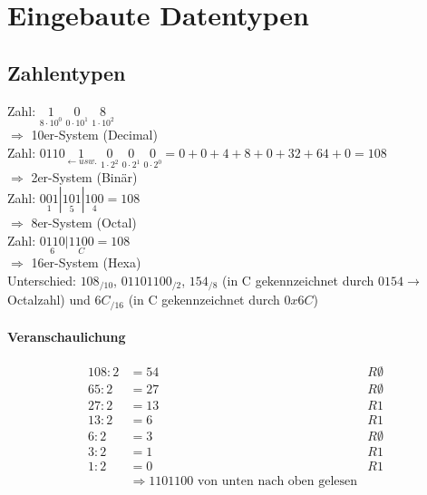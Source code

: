 







\maketitle
\newpage
\tableofcontents
\newpage


\section{Eingebaute Datentypen}

\subsection{Zahlentypen}
Zahl: $\underset{8\cdot 10^0}{1} \; \underset{0 \cdot 10^1}{0} \;\underset{1\cdot 10^2}{8}$\\
$\Rightarrow$ 10er-System (Decimal)\\
Zahl: $0110\underset{\leftarrow usw.}{1}\;\underset{1\cdot 2^2}{0}\;\underset{0\cdot 2^1}{0}\;\underset{0\cdot 2^0}{0} = 0 + 0 + 4+8+0+32+64+0 =108$\\
$\Rightarrow$ 2er-System (Binär)\\
Zahl: $\underset{1}{001}|\underset{5}{101}|\underset{4}{100}=108$\\
$\Rightarrow$ 8er-System (Octal)\\
Zahl: $\underset{6}{0110}|\underset{C}{1100}=108$\\
$\Rightarrow$ 16er-System (Hexa)\\
Unterschied: $108_{/10}$, $01101100_{/2}$, $154_{/8}$ (in C gekennzeichnet durch $0154\rightarrow$ Octalzahl) und $6C_{/16}$ (in C gekennzeichnet durch $0x6C$)\\

\paragraph{Veranschaulichung}
\begin{align*}
108:2&=54 &R \emptyset\\
65:2 &= 27 &R \emptyset\\
27:2&= 13 &R 1\\
13:2 &= 6 &R 1\\
6:2 &=3 &R \emptyset\\
3:2 &= 1 &R 1\\
1:2&= 0 &R 1\\
&\Rightarrow 1101100 \text{ von unten nach oben gelesen}&
\end{align*}

